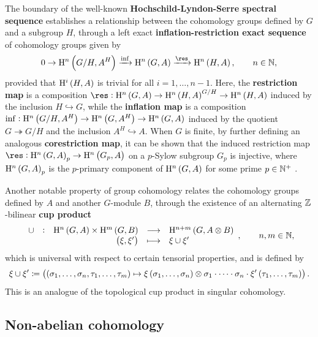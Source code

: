 The boundary of the well-known \textbf{Hochschild-Lyndon-Serre spectral sequence} establishes a relationship between the cohomology groups defined by $ G $ and a subgroup $ H $, through a left exact \textbf{inflation-restriction exact sequence} of cohomology groups \cite[Proposition VII.5]{Ser80} given by
$$ 0 \to \H^n\br{G / H, A^H} \xrightarrow{\inf} \H^n\br{G, A} \xrightarrow{\res} \H^n\br{H, A}, \qquad n \in \NN, $$
provided that $ \H^i\br{H, A} $ is trivial for all $ i = 1, \dots, n - 1 $. Here, the \textbf{restriction map} is a composition $ \res : \H^n\br{G, A} \to \H^n\br{H, A}^{G / H} \to \H^n\br{H, A} $ induced by the inclusion $ H \hookrightarrow G $, while the \textbf{inflation map} is a composition $ \inf : \H^n\br{G / H, A^H} \to \H^n\br{G, A^H} \to \H^n\br{G, A} $ induced by the quotient $ G \twoheadrightarrow G / H $ and the inclusion $ A^H \hookrightarrow A $. When $ G $ is finite, by further defining an analogous \textbf{corestriction map}, it can be shown that the induced restriction map $ \res : \H^n\br{G, A}_p \to \H^n\br{G_p, A} $ on a $ p $-Sylow subgroup $ G_p $ is injective, where $ \H^n\br{G, A}_p $ is the $ p $-primary component of $ \H^n\br{G, A} $ for some prime $ p \in \mathbb{N}^+ $ \cite[Theorem IX.4]{Ser80}.

Another notable property of group cohomology relates the cohomology groups defined by $ A $ and another $ G $-module $ B $, through the existence of an alternating $ \mathbb{Z} $-bilinear \textbf{cup product} \cite[Proposition VIII.5]{Ser80}
$$ \function[\cup]{\H^n\br{G, A} \times \H^m\br{G, B}}{\H^{n + m}\br{G, A \otimes B}}{\br{\xi, \xi'}}{\xi \cup \xi'}, \qquad n, m \in \NN, $$
which is universal with respect to certain tensorial properties, and is defined by
$$ \xi \cup \xi' \coloneqq \br{\br{\sigma_1, \dots, \sigma_n, \tau_1, \dots, \tau_m} \mapsto \xi\br{\sigma_1, \dots, \sigma_n} \otimes \sigma_1 \cdot \dots \cdot \sigma_n \cdot \xi'\br{\tau_1, \dots, \tau_m}}. $$
This is an analogue of the topological cup product in singular cohomology.

\pagebreak

\subsection{Non-abelian cohomology}

